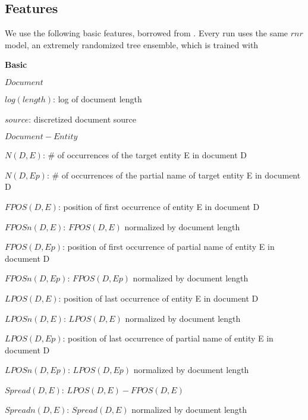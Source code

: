 \documentclass{article}
\begin{document}
\subsection{Features}

We use the following basic features, borrowed from \cite{jingang13}.
Every run uses the same $rnr$ model, an extremely randomized tree ensemble, which is trained with 

\begin{itemize*}
  \item \textbf{Basic}
    \begin{itemize*}
      \item $Document$
        \begin{itemize*}
            \item $log(length)$: log of document length
            \item $source$: discretized document source
        \end{itemize*}
      \item $Document-Entity$
        \begin{itemize*}
            \item $N(D,E)$: \# of occurrences of the target entity E in document D
            \item $N(D,Ep)$: \# of occurrences of the partial name of target entity E in document D
            \item $FPOS(D,E)$: position of first occurrence of entity E in document D
            \item $FPOSn(D,E)$: $FPOS(D,E)$ normalized by document length
            \item $FPOS(D,Ep)$: position of first occurrence of partial name of entity E in document D
            \item $FPOSn(D,Ep)$: $FPOS(D,Ep)$ normalized by document length
            \item $LPOS(D,E)$: position of last occurrence of entity E in document D
            \item $LPOSn(D,E)$: $LPOS(D,E)$ normalized by document length
            \item $LPOS(D,Ep)$: position of last occurrence of partial name of entity E in document D
            \item $LPOSn(D,Ep)$: $LPOS(D,Ep)$ normalized by document length
            \item $Spread(D,E)$: $LPOS(D,E) - FPOS(D,E)$
            \item $Spreadn(D,E)$: $Spread(D,E)$ normalized by document length

\end{itemize*}
\end{itemize*}
\end{itemize*}
\end{document}
